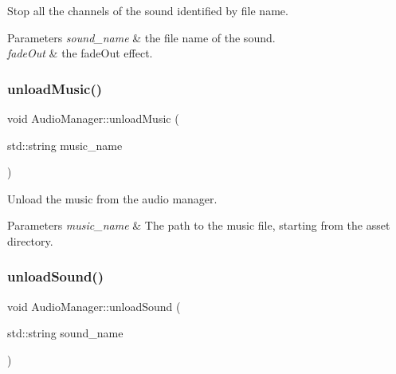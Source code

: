 Stop all the channels of the sound identified by file name. 


\begin{DoxyParams}{Parameters}
{\em sound\+\_\+name} & the file name of the sound. \\
\hline
{\em fade\+Out} & the fade\+Out effect. \\
\hline
\end{DoxyParams}
\mbox{\label{class_audio_manager_a6abc50fbd069dae8b38bb8d8aa9476cd}} 
\subsubsection{\texorpdfstring{unload\+Music()}{unloadMusic()}}
{\footnotesize\ttfamily void Audio\+Manager\+::unload\+Music (\begin{DoxyParamCaption}\item[{std\+::string}]{music\+\_\+name }\end{DoxyParamCaption})\hspace{0.3cm}{\ttfamily [static]}}



Unload the music from the audio manager. 


\begin{DoxyParams}{Parameters}
{\em music\+\_\+name} & The path to the music file, starting from the asset directory. \\
\hline
\end{DoxyParams}
\mbox{\label{class_audio_manager_af492087dd75a160562ef06c6600f54b5}} 
\subsubsection{\texorpdfstring{unload\+Sound()}{unloadSound()}}
{\footnotesize\ttfamily void Audio\+Manager\+::unload\+Sound (\begin{DoxyParamCaption}\item[{std\+::string}]{sound\+\_\+name }\end{DoxyParamCaption})\hspace{0.3cm}{\ttfamily [static]}}



